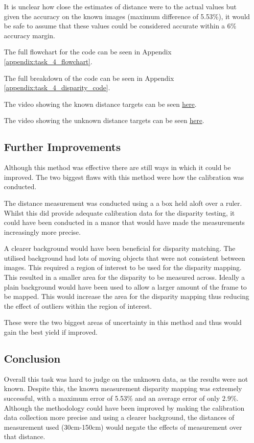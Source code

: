 \documentclass[conference]{IEEEtran}
\begin{document}
It is unclear how close the estimates of distance were to the actual values but given the accuracy on the known images (maximum difference of 5.53\%), it would be safe to assume that these values could be considered accurate within a 6\% accuracy margin.

The full flowchart for the code can be seen in Appendix \ref{appendix:task_4_flowchart}.

The full breakdown of the code can be seen in Appendix \ref{appendix:task_4_disparity_code}.

The video showing the known distance targets can be seen \href{https://youtu.be/jV-Ht9x28nk}{here}.

The video showing the unknown distance targets can be seen \href{https://youtu.be/g0bPXUbjqvo}{here}.

\subsection{Further Improvements}

Although this method was effective there are still ways in which it could be improved. The two biggest flaws with this method were how the calibration was conducted.

The distance measurement was conducted using a a box held aloft over a ruler. Whilst this did provide adequate calibration data for the disparity testing, it could have been conducted in a manor that would have made the measurements increasingly more precise. 

A clearer background would have been beneficial for disparity matching. The utilised background had lots of moving objects that were not consistent between images. This required a region of interest to be used for the disparity mapping. This resulted in a smaller area for the disparity to be measured across. Ideally a plain background would have been used to allow a larger amount of the frame to be mapped. This would increase the area for the disparity mapping thus reducing the effect of outliers within the region of interest. 

These were the two biggest areas of uncertainty in this method and thus would gain the best yield if improved. 

\subsection{Conclusion}
Overall this task was hard to judge on the unknown data, as the results were not known. Despite this, the known measurement disparity mapping was extremely successful, with a maximum error of 5.53\% and an average error of only 2.9\%. Although the methodology could have been improved by making the calibration data collection more precise and using a clearer background, the distances of measurement used (30cm-150cm) would negate the effects of measurement over that distance. 
\end{document}
